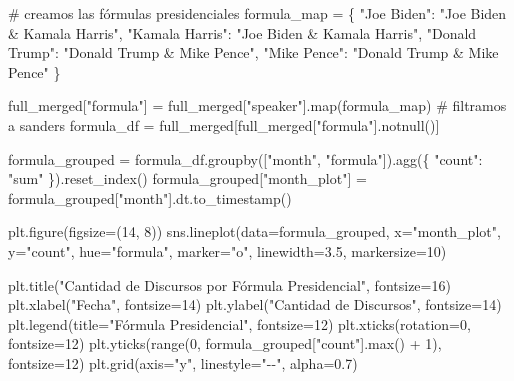 \documentclass[
  letterpaper,
  DIV=11,
  numbers=noendperiod]{scrartcl}
\newenvironment{Shaded}{\begin{snugshade}}{\end{snugshade}}
\newcommand{\BuiltInTok}[1]{\textcolor[rgb]{0.00,0.23,0.31}{#1}}
\newcommand{\CommentTok}[1]{\textcolor[rgb]{0.37,0.37,0.37}{#1}}
\newcommand{\DecValTok}[1]{\textcolor[rgb]{0.68,0.00,0.00}{#1}}
\newcommand{\FloatTok}[1]{\textcolor[rgb]{0.68,0.00,0.00}{#1}}
\newcommand{\NormalTok}[1]{\textcolor[rgb]{0.00,0.23,0.31}{#1}}
\newcommand{\OperatorTok}[1]{\textcolor[rgb]{0.37,0.37,0.37}{#1}}
\newcommand{\StringTok}[1]{\textcolor[rgb]{0.13,0.47,0.30}{#1}}
\begin{document}
\begin{Shaded}
\begin{Highlighting}[]
\CommentTok{\# creamos las fórmulas presidenciales}
\NormalTok{formula\_map }\OperatorTok{=}\NormalTok{ \{}
    \StringTok{"Joe Biden"}\NormalTok{: }\StringTok{"Joe Biden \& Kamala Harris"}\NormalTok{,}
    \StringTok{"Kamala Harris"}\NormalTok{: }\StringTok{"Joe Biden \& Kamala Harris"}\NormalTok{,}
    \StringTok{"Donald Trump"}\NormalTok{: }\StringTok{"Donald Trump \& Mike Pence"}\NormalTok{,}
    \StringTok{"Mike Pence"}\NormalTok{: }\StringTok{"Donald Trump \& Mike Pence"}
\NormalTok{\}}

\NormalTok{full\_merged[}\StringTok{"formula"}\NormalTok{] }\OperatorTok{=}\NormalTok{ full\_merged[}\StringTok{"speaker"}\NormalTok{].}\BuiltInTok{map}\NormalTok{(formula\_map)}
\CommentTok{\# filtramos a sanders}
\NormalTok{formula\_df }\OperatorTok{=}\NormalTok{ full\_merged[full\_merged[}\StringTok{"formula"}\NormalTok{].notnull()]}

\NormalTok{formula\_grouped }\OperatorTok{=}\NormalTok{ formula\_df.groupby([}\StringTok{"month"}\NormalTok{, }\StringTok{"formula"}\NormalTok{]).agg(\{}
    \StringTok{"count"}\NormalTok{: }\StringTok{"sum"}
\NormalTok{\}).reset\_index()}
\NormalTok{formula\_grouped[}\StringTok{"month\_plot"}\NormalTok{] }\OperatorTok{=}\NormalTok{ formula\_grouped[}\StringTok{"month"}\NormalTok{].dt.to\_timestamp()}

\NormalTok{plt.figure(figsize}\OperatorTok{=}\NormalTok{(}\DecValTok{14}\NormalTok{, }\DecValTok{8}\NormalTok{))}
\NormalTok{sns.lineplot(data}\OperatorTok{=}\NormalTok{formula\_grouped, x}\OperatorTok{=}\StringTok{"month\_plot"}\NormalTok{, y}\OperatorTok{=}\StringTok{"count"}\NormalTok{, hue}\OperatorTok{=}\StringTok{"formula"}\NormalTok{, marker}\OperatorTok{=}\StringTok{"o"}\NormalTok{, linewidth}\OperatorTok{=}\FloatTok{3.5}\NormalTok{, markersize}\OperatorTok{=}\DecValTok{10}\NormalTok{)}

\NormalTok{plt.title(}\StringTok{"Cantidad de Discursos por Fórmula Presidencial"}\NormalTok{, fontsize}\OperatorTok{=}\DecValTok{16}\NormalTok{)}
\NormalTok{plt.xlabel(}\StringTok{"Fecha"}\NormalTok{, fontsize}\OperatorTok{=}\DecValTok{14}\NormalTok{)}
\NormalTok{plt.ylabel(}\StringTok{"Cantidad de Discursos"}\NormalTok{, fontsize}\OperatorTok{=}\DecValTok{14}\NormalTok{)}
\NormalTok{plt.legend(title}\OperatorTok{=}\StringTok{"Fórmula Presidencial"}\NormalTok{, fontsize}\OperatorTok{=}\DecValTok{12}\NormalTok{)}
\NormalTok{plt.xticks(rotation}\OperatorTok{=}\DecValTok{0}\NormalTok{, fontsize}\OperatorTok{=}\DecValTok{12}\NormalTok{)}
\NormalTok{plt.yticks(}\BuiltInTok{range}\NormalTok{(}\DecValTok{0}\NormalTok{, formula\_grouped[}\StringTok{"count"}\NormalTok{].}\BuiltInTok{max}\NormalTok{() }\OperatorTok{+} \DecValTok{1}\NormalTok{), fontsize}\OperatorTok{=}\DecValTok{12}\NormalTok{)}
\NormalTok{plt.grid(axis}\OperatorTok{=}\StringTok{"y"}\NormalTok{, linestyle}\OperatorTok{=}\StringTok{"{-}{-}"}\NormalTok{, alpha}\OperatorTok{=}\FloatTok{0.7}\NormalTok{)}


\end{Highlighting}
\end{Shaded}
\end{document}
